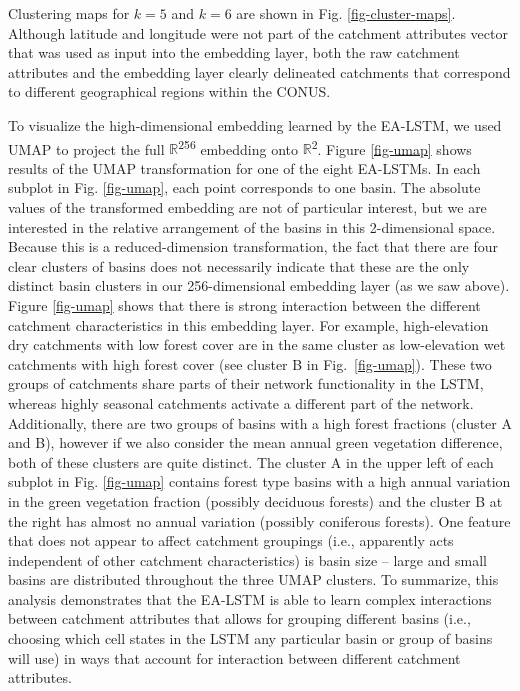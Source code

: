 Clustering maps for $k=5$ and $k=6$ are shown in Fig. \ref{fig-cluster-maps}. 
Although latitude and longitude were not part of the catchment attributes vector that was used as input into the embedding layer, both the raw catchment attributes and the embedding layer clearly delineated catchments that correspond to different geographical regions within the CONUS. 

To visualize the high-dimensional embedding learned by the \gls{EA-LSTM}, we used UMAP \citep{mcinnes2018umap} to project the full $\mathbb{R}$\textsuperscript{256} embedding onto $\mathbb{R}$\textsuperscript{2}. 
Figure \ref{fig-umap} shows results of the UMAP transformation for one of the eight \glspl{EA-LSTM}. 
In each subplot in Fig. \ref{fig-umap}, each point corresponds to one basin. The absolute values of the transformed embedding are not of particular interest, but we are interested in the relative arrangement of the basins in this 2-dimensional space. Because this is a reduced-dimension transformation, the fact that there are four clear clusters of basins does not necessarily indicate that these are the only distinct basin clusters in our 256-dimensional embedding layer (as we saw above). Figure \ref{fig-umap} shows that there is strong interaction between the different catchment characteristics in this embedding layer. For example, high-elevation dry catchments with low forest cover are in the same cluster as low-elevation wet catchments with high forest cover (see cluster B in Fig.~\ref{fig-umap}). 
These two groups of catchments share parts of their network functionality in the \gls{LSTM}, whereas highly seasonal catchments activate a different part of the network. Additionally, there are two groups of basins with a high forest fractions (cluster A and B), however if we also consider the mean annual green vegetation difference, both of these clusters are quite distinct. The cluster A in the upper left of each subplot in Fig. \ref{fig-umap} contains forest type basins with a high annual variation in the green vegetation fraction (possibly deciduous forests) and the cluster B at the right has almost no annual variation (possibly coniferous forests). One feature that does not appear to affect catchment groupings (i.e., apparently acts independent of other catchment characteristics) is basin size – large and small basins are distributed throughout the three UMAP clusters. To summarize, this analysis demonstrates that the \gls{EA-LSTM} is able to learn complex interactions between catchment attributes that allows for grouping different basins (i.e., choosing which cell states in the \gls{LSTM} any particular basin or group of basins will use) in ways that account for interaction between different catchment attributes.

